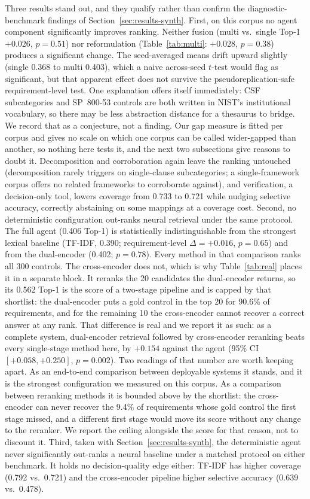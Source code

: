 \documentclass[a4paper,fleqn]{cas-sc}
\begin{document}
Three results stand out, and they qualify rather than confirm the diagnostic-benchmark findings of Section~\ref{sec:results-synth}.
First, on this corpus no agent component significantly improves ranking.
Neither fusion (multi vs.\ single Top-1 $+0.026$, $p = 0.51$) nor reformulation (Table~\ref{tab:multi}: $+0.028$, $p = 0.38$) produces a significant change.
The seed-averaged means drift upward slightly (single 0.368 to multi 0.403), which a naive across-seed $t$-test would flag as significant, but that apparent effect does not survive the pseudoreplication-safe requirement-level test.
One explanation offers itself immediately: CSF subcategories and SP~800-53 controls are both written in NIST's institutional vocabulary, so there may be less abstraction distance for a thesaurus to bridge.
We record that as a conjecture, not a finding. Our gap measure is fitted per corpus and gives no scale on which one corpus can be called wider-gapped than another, so nothing here tests it, and the next two subsections give reasons to doubt it.
Decomposition and corroboration again leave the ranking untouched (decomposition rarely triggers on single-clause subcategories; a single-framework corpus offers no related frameworks to corroborate against), and verification, a decision-only tool, lowers coverage from 0.733 to 0.721 while nudging selective accuracy, correctly abstaining on some mappings at a coverage cost.
Second, no deterministic configuration out-ranks neural retrieval under the same protocol.
The full agent (0.406 Top-1) is statistically indistinguishable from the strongest lexical baseline (TF-IDF, 0.390; requirement-level $\Delta=+0.016$, $p=0.65$) and from the dual-encoder (0.402; $p=0.78$).
Every method in that comparison ranks all 300 controls.
The cross-encoder does not, which is why Table~\ref{tab:real} places it in a separate block.
It reranks the 20 candidates the dual-encoder returns, so its 0.562 Top-1 is the score of a two-stage pipeline and is capped by that shortlist: the dual-encoder puts a gold control in the top 20 for 90.6\% of requirements, and for the remaining 10 the cross-encoder cannot recover a correct answer at any rank.
That difference is real and we report it as such: as a complete system, dual-encoder retrieval followed by cross-encoder reranking beats every single-stage method here, by $+0.154$ against the agent (95\% CI $[+0.058, +0.250]$, $p=0.002$).
Two readings of that number are worth keeping apart. As an end-to-end comparison between deployable systems it stands, and it is the strongest configuration we measured on this corpus. As a comparison between reranking methods it is bounded above by the shortlist: the cross-encoder can never recover the 9.4\% of requirements whose gold control the first stage missed, and a different first stage would move its score without any change to the reranker. We report the ceiling alongside the score for that reason, not to discount it.
Third, taken with Section~\ref{sec:results-synth}, the deterministic agent never significantly out-ranks a neural baseline under a matched protocol on either benchmark.
It holds no decision-quality edge either: TF-IDF has higher coverage (0.792 vs.\ 0.721) and the cross-encoder pipeline higher selective accuracy (0.639 vs.\ 0.478).
\end{document}
